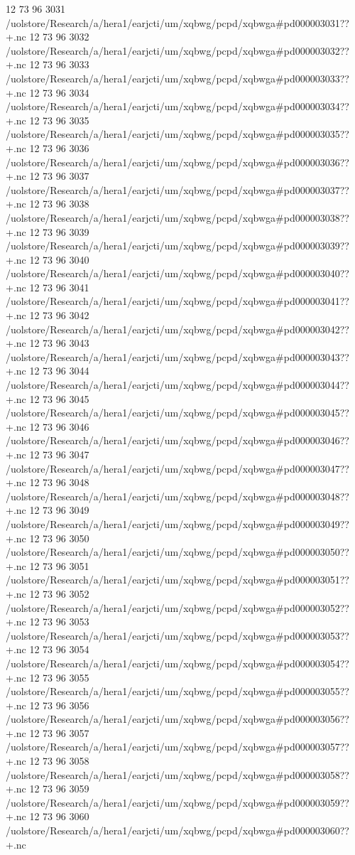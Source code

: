 12 73 96
3031
/uolstore/Research/a/hera1/earjcti/um/xqbwg/pcpd/xqbwga#pd000003031??+.nc
12 73 96
3032
/uolstore/Research/a/hera1/earjcti/um/xqbwg/pcpd/xqbwga#pd000003032??+.nc
12 73 96
3033
/uolstore/Research/a/hera1/earjcti/um/xqbwg/pcpd/xqbwga#pd000003033??+.nc
12 73 96
3034
/uolstore/Research/a/hera1/earjcti/um/xqbwg/pcpd/xqbwga#pd000003034??+.nc
12 73 96
3035
/uolstore/Research/a/hera1/earjcti/um/xqbwg/pcpd/xqbwga#pd000003035??+.nc
12 73 96
3036
/uolstore/Research/a/hera1/earjcti/um/xqbwg/pcpd/xqbwga#pd000003036??+.nc
12 73 96
3037
/uolstore/Research/a/hera1/earjcti/um/xqbwg/pcpd/xqbwga#pd000003037??+.nc
12 73 96
3038
/uolstore/Research/a/hera1/earjcti/um/xqbwg/pcpd/xqbwga#pd000003038??+.nc
12 73 96
3039
/uolstore/Research/a/hera1/earjcti/um/xqbwg/pcpd/xqbwga#pd000003039??+.nc
12 73 96
3040
/uolstore/Research/a/hera1/earjcti/um/xqbwg/pcpd/xqbwga#pd000003040??+.nc
12 73 96
3041
/uolstore/Research/a/hera1/earjcti/um/xqbwg/pcpd/xqbwga#pd000003041??+.nc
12 73 96
3042
/uolstore/Research/a/hera1/earjcti/um/xqbwg/pcpd/xqbwga#pd000003042??+.nc
12 73 96
3043
/uolstore/Research/a/hera1/earjcti/um/xqbwg/pcpd/xqbwga#pd000003043??+.nc
12 73 96
3044
/uolstore/Research/a/hera1/earjcti/um/xqbwg/pcpd/xqbwga#pd000003044??+.nc
12 73 96
3045
/uolstore/Research/a/hera1/earjcti/um/xqbwg/pcpd/xqbwga#pd000003045??+.nc
12 73 96
3046
/uolstore/Research/a/hera1/earjcti/um/xqbwg/pcpd/xqbwga#pd000003046??+.nc
12 73 96
3047
/uolstore/Research/a/hera1/earjcti/um/xqbwg/pcpd/xqbwga#pd000003047??+.nc
12 73 96
3048
/uolstore/Research/a/hera1/earjcti/um/xqbwg/pcpd/xqbwga#pd000003048??+.nc
12 73 96
3049
/uolstore/Research/a/hera1/earjcti/um/xqbwg/pcpd/xqbwga#pd000003049??+.nc
12 73 96
3050
/uolstore/Research/a/hera1/earjcti/um/xqbwg/pcpd/xqbwga#pd000003050??+.nc
12 73 96
3051
/uolstore/Research/a/hera1/earjcti/um/xqbwg/pcpd/xqbwga#pd000003051??+.nc
12 73 96
3052
/uolstore/Research/a/hera1/earjcti/um/xqbwg/pcpd/xqbwga#pd000003052??+.nc
12 73 96
3053
/uolstore/Research/a/hera1/earjcti/um/xqbwg/pcpd/xqbwga#pd000003053??+.nc
12 73 96
3054
/uolstore/Research/a/hera1/earjcti/um/xqbwg/pcpd/xqbwga#pd000003054??+.nc
12 73 96
3055
/uolstore/Research/a/hera1/earjcti/um/xqbwg/pcpd/xqbwga#pd000003055??+.nc
12 73 96
3056
/uolstore/Research/a/hera1/earjcti/um/xqbwg/pcpd/xqbwga#pd000003056??+.nc
12 73 96
3057
/uolstore/Research/a/hera1/earjcti/um/xqbwg/pcpd/xqbwga#pd000003057??+.nc
12 73 96
3058
/uolstore/Research/a/hera1/earjcti/um/xqbwg/pcpd/xqbwga#pd000003058??+.nc
12 73 96
3059
/uolstore/Research/a/hera1/earjcti/um/xqbwg/pcpd/xqbwga#pd000003059??+.nc
12 73 96
3060
/uolstore/Research/a/hera1/earjcti/um/xqbwg/pcpd/xqbwga#pd000003060??+.nc

